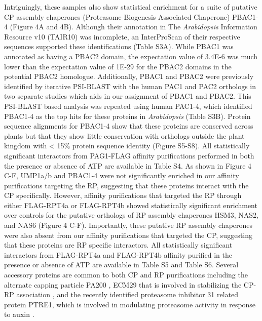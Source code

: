 Intriguingly, these samples also show statistical enrichment for a suite of putative CP assembly chaperones (Proteasome Biogenesis Associated Chaperone) PBAC1-4 (Figure 4A and 4B). Although their annotation in The \textit{Arabidopsis} Information Resource v10 (TAIR10) was incomplete, an InterProScan of their respective sequences supported these identifications (Table S3A). While PBAC1 was annotated as having a PBAC2 domain, the expectation value of 3.4E-6 was much lower than the expectation value of 1E-29 for the PBAC2 domains in the potential PBAC2 homologue. Additionally, PBAC1 and PBAC2 were previously identified by iterative PSI-BLAST with the human PAC1 and PAC2 orthologs in two separate studies \citep{kusmierczyk11, le07} which aids in our assignment of PBAC1 and PBAC2. This PSI-BLAST based analysis was repeated using human PAC1-4, which identified PBAC1-4 as the top hits for these proteins in \textit{Arabidopsis} (Table S3B). Protein sequence alignments for PBAC1-4 show that these proteins are conserved across plants but that they show little conservation with orthologs outside the plant kingdom with < 15\% protein sequence identity (Figure S5-S8).  All statistically significant interactors from PAG1-FLAG affinity purifications performed in both the presence or absence of ATP are available in Table S4.
As shown in Figure 4 C-F, UMP1a/b and PBAC1-4 were not significantly enriched in our affinity purifications targeting the RP, suggesting that these proteins interact with the CP specifically. However, affinity purifications that targeted the RP through either FLAG-RPT4a or FLAG-RPT4b showed statistically significant enrichment over controls for the putative orthologs of RP assembly chaperones HSM3, NAS2, and NAS6 (Figure 4 C-F). Importantly, these putative RP assembly chaperones were also absent from our affinity purifications that targeted the CP, suggesting that these proteins are RP specific interactors. All statistically significant interactors from FLAG-RPT4a and FLAG-RPT4b affinity purified in the presence or absence of ATP are available in Table S5 and Table S6. Several accessory proteins are common to both CP and RP purifications including the alternate capping particle PA200 \citep{book10}, ECM29 that is involved in stabilizing the CP-RP association \citep{lehmann10}, and the recently identified proteasome inhibitor 31 related protein PTRE1, which is involved in modulating proteasome activity in response to auxin \citep{yang16}. 

